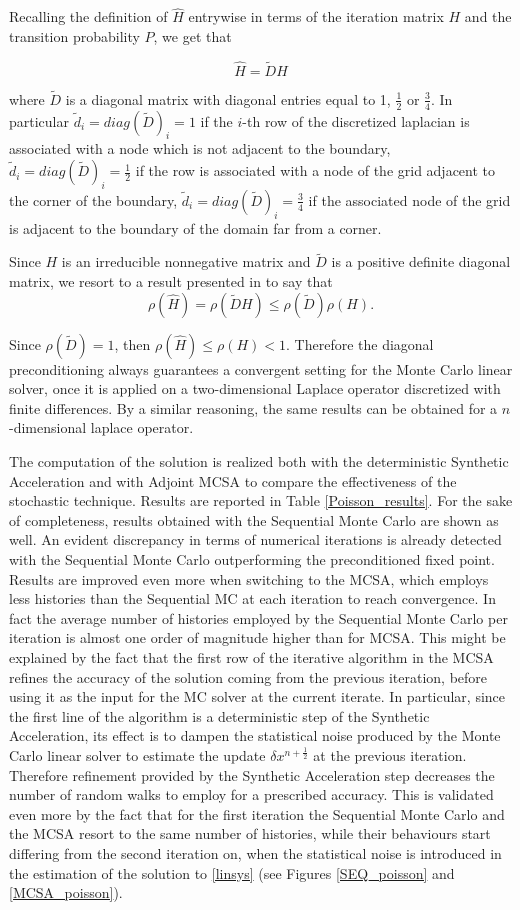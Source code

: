 Recalling the definition of $\hat{H}$ entrywise in terms of the
iteration matrix $H$ and the transition probability $P$, we get that

\[
 \hat{H}=\tilde{D}H
\]

where $\tilde{D}$ is a diagonal matrix with diagonal entries equal to
1, $\frac{1}{2}$ or $\frac{3}{4}$.
In particular $\tilde{d}_i=diag(\tilde D)_i=1$ if the $i$-th row of the
discretized laplacian is associated with a node which is not adjacent to the
boundary, $\tilde{d}_i=diag(\tilde D)_i=\frac{1}{2}$ if the row is associated
with a node of the grid adjacent to the corner of the boundary,
$\tilde{d}_i=diag(\tilde D)_i=\frac{3}{4}$ if the associated node of the grid
is adjacent to the boundary of the domain far from a corner.

Since $H$ is an irreducible nonnegative matrix and $\tilde{D}$ is a
positive definite diagonal matrix, we resort to a result presented in
\cite{FK1975} to say that
\[
 \rho(\hat{H})=\rho(\tilde{D}H)\le \rho(\tilde D)\rho(H).
\]

Since $\rho(\tilde{D})=1$, then $\rho(\hat{H})\le \rho(H)<1$.
Therefore the diagonal preconditioning always guarantees a convergent
setting for the Monte Carlo linear solver, once it is applied on a
two-dimensional Laplace
operator discretized with finite differences. By a similar reasoning, the same
results can be obtained for a $n$-dimensional laplace operator.


The computation of the solution is realized both with the deterministic
Synthetic Acceleration and with Adjoint MCSA to compare the effectiveness of
the
stochastic technique. Results are reported in Table
\ref{Poisson_results}. For the sake of completeness, results obtained with
the Sequential Monte Carlo are shown as well. An evident discrepancy in terms
of numerical iterations
is already detected with the Sequential Monte Carlo outperforming the
preconditioned fixed point. Results are improved even more
when
switching to the MCSA, which employs less histories than the Sequential MC at
each iteration to
reach convergence. In fact the average number of histories employed by the
Sequential
Monte Carlo per iteration is almost one order of magnitude higher than for
MCSA. This
might be explained by the fact that the first row of the iterative algorithm in
the MCSA refines the accuracy of the solution coming from the previous
iteration,
before using it as the input for the MC solver at the current iterate.
In particular, since the first line of the algorithm is a deterministic step of
the Synthetic Acceleration, its effect is to dampen the statistical noise
produced by the Monte Carlo linear solver to estimate the update $\delta
x^{n + \frac{1}{2}}$ at the previous iteration. Therefore
refinement provided by the Synthetic Acceleration step decreases the number of
random walks
to employ for a prescribed accuracy. This is validated even more by the fact
that for the first iteration the Sequential Monte Carlo and the MCSA resort to
the same number of histories, while their behaviours start differing from the
second iteration on, when the statistical noise is introduced in the estimation
of the solution to \ref{linsys} (see Figures \ref{SEQ_poisson} and
\ref{MCSA_poisson}).


